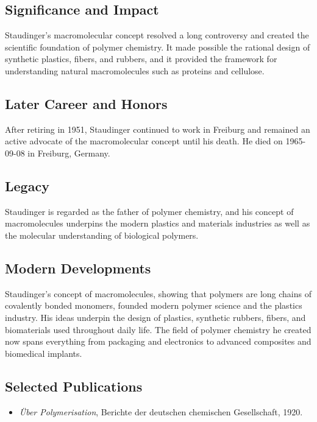 \subsection*{Significance and Impact}

Staudinger's macromolecular concept resolved a long controversy and created the scientific foundation of polymer chemistry. It made possible the rational design of synthetic plastics, fibers, and rubbers, and it provided the framework for understanding natural macromolecules such as proteins and cellulose.

\subsection*{Later Career and Honors}

After retiring in 1951, Staudinger continued to work in Freiburg and remained an active advocate of the macromolecular concept until his death. He died on 1965-09-08 in Freiburg, Germany.

\subsection*{Legacy}

Staudinger is regarded as the father of polymer chemistry, and his concept of macromolecules underpins the modern plastics and materials industries as well as the molecular understanding of biological polymers.

\subsection*{Modern Developments}

Staudinger's concept of macromolecules, showing that polymers are long chains of covalently bonded monomers, founded modern polymer science and the plastics industry. His ideas underpin the design of plastics, synthetic rubbers, fibers, and biomaterials used throughout daily life. The field of polymer chemistry he created now spans everything from packaging and electronics to advanced composites and biomedical implants.

\subsection*{Selected Publications}

\begin{itemize}

\item \emph{{\"U}ber Polymerisation}, Berichte der deutschen chemischen Gesellschaft, 1920.

\end{itemize}

